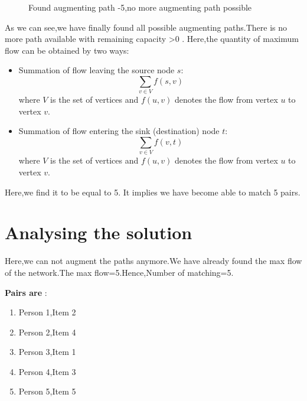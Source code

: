 \documentclass{article}
\begin{document}
\begin{figure}[H]
\begin{center}
\begin{tikzpicture}
            
            

        \end{tikzpicture}   \caption{Found augmenting path -5,no more augmenting path possible}  \end{center} \end{figure}
As we can see,we have finally found all possible augmenting paths.There is no more path available with remaining capacity \textgreater{0} .\newline 
Here,the quantity of maximum flow can be obtained by two ways:
\begin{itemize}
    \item Summation of flow leaving the source node $s$:
    \[
        \sum_{v \in V} f(s, v)
    \]
    where $V$ is the set of vertices and $f(u, v)$ denotes the flow from vertex $u$ to vertex $v$.
    
    \item Summation of flow entering the sink (destination) node $t$:
    \[
        \sum_{v \in V} f(v, t)
    \]
    where $V$ is the set of vertices and $f(u, v)$ denotes the flow from vertex $u$ to vertex $v$.
\end{itemize}

Here,we find it to be equal to 5.
It implies we have become able to match 5 pairs.

\newpage


\section{Analysing the solution}

          Here,we can not augment the paths anymore.We have already found the max flow of the network.The max flow=5.Hence,Number of matching=5.
        
        \textbf{Pairs are} : 
        \begin{enumerate}
            \item Person 1,Item 2
            
            \item Person 2,Item 4
            
            \item Person 3,Item 1
            
            \item Person 4,Item 3
            
            \item Person 5,Item 5
        \end{enumerate}
        
\end{document}
